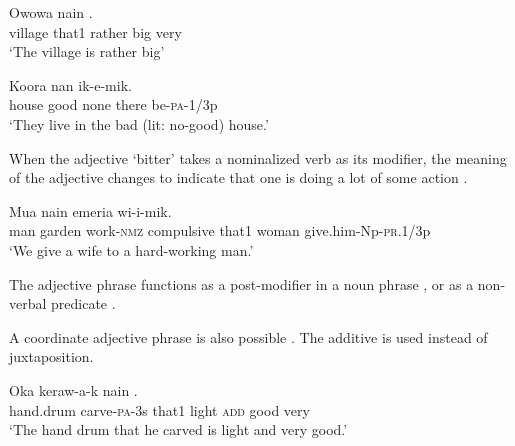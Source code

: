 \ea%
\label{ex:4:x841}
\gll Owowa  nain    . \\
    village  that1  rather  big  very  \\
\glt`The village is rather big'
\z

\ea%
\label{ex:4:x842}
\gll Koora     nan  ik-e-mik. \\
   house  good  none  there  be-\textsc{pa}-1/3p   \\
\glt`They live in the bad (lit: no-good) house.'
\z

When the adjective   `bitter' takes a nominalized verb as its modifier, the meaning of the adjective changes to indicate that one is doing a lot of some action .

\ea%
\label{ex:4:x840}
\gll Mua       nain  emeria wi-i-mik. \\
   man  garden  work-\textsc{nmz}  compulsive  that1  woman  give.him-Np-\textsc{pr}.1/3p   \\
\glt`We give a wife to a hard-working man.'
\z

The adjective phrase functions as a post-modifier in a noun phrase , or as a non-verbal predicate . 

A coordinate adjective phrase is also possible . The additive  is used instead of juxtaposition.

\ea%
\label{ex:4:x891}
\gll Oka  keraw-a-k  nain     . \\
    hand.drum  carve-\textsc{pa}-3s  that1  light  \textsc{add}  good  very  \\
\glt`The hand drum that he carved is light and very good.'
\z

  

